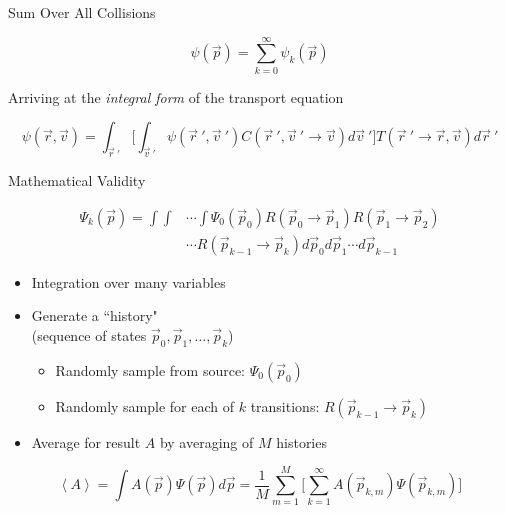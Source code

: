 \documentclass[xcolor=x11names,compress,handout]{beamer}
\renewcommand{\(}{\begin{columns}}
\renewcommand{\)}{\end{columns}}
\newcommand{\<}[1]{\begin{column}{#1}}
\renewcommand{\>}{\end{column}}
\begin{document}
\begin{frame}{Sum Over All Collisions}

\[\psi(\vec{p}) = \sum_{k=0}^{\infty} \psi_k(\vec{p})\]

\vspace*{1 em}
Arriving at the \textit{integral form} of the transport equation

\[\psi(\vec{r}, \vec{v}) = \int_{\vec{r}\:'} \biggl[ \int_{\vec{v}\:'} \psi(\vec{r}\:', \vec{v}\:') C(\vec{r}\:', \vec{v}\:' \rightarrow \vec{v})  d\vec{v}\:'\biggr] T(\vec{r}\:' \rightarrow \vec{r}, \vec{v}) d\vec{r}\:'\]

\end{frame}


\begin{frame}{Mathematical Validity}

\begin{align*}
\Psi_{k}(\vec{p}) = \int\int &\cdots \int \Psi_{0}(\vec{p}_{0}) R(\vec{p}_{0} \rightarrow \vec{p}_{1})R(\vec{p}_{1} \rightarrow \vec{p}_{2}) \\&\cdots R(\vec{p}_{k-1} \rightarrow \vec{p}_{k}) d\vec{p}_{0} d\vec{p}_{1} \cdots d\vec{p}_{k-1}
\end{align*}

\begin{itemize}
\item Integration over many variables
\hspace*{0.5 em}
\item Generate a ``history"\\
(sequence of states $\vec{p}_0, \vec{p}_1 , \dots, \vec{p}_k$)
\begin{itemize}
 \item Randomly sample from source: $\Psi_0 (\vec{p}_0)$
 \item Randomly sample for each of $k$ transitions: $R(\vec{p}_{k-1} \rightarrow \vec{p}_{k})$
\end{itemize}

\item Average for result $A$ by averaging of $M$ histories
\end{itemize}

\[\left\langle A \right\rangle = \int A(\vec{p})\Psi(\vec{p}) d\vec{p} 
= \frac{1}{M} \sum_{m=1}^M \biggl[ \sum_{k=1}^{\infty} A(\vec{p}_{k,m}) \Psi(\vec{p}_{k,m}) \biggr] \]

\end{frame}
\end{document}
